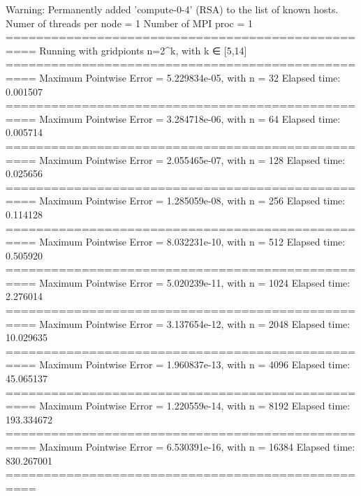 Warning: Permanently added 'compute-0-4' (RSA) to the list of known hosts.
Numer of threads per node = 1 
Number of MPI proc = 1 
================================================== 
Running with gridpionts n=2^k, with k ∈ [5,14]
================================================== 
Maximum Pointwise Error = 5.229834e-05, with n = 32 
Elapsed time: 0.001507
================================================== 
Maximum Pointwise Error = 3.284718e-06, with n = 64 
Elapsed time: 0.005714
================================================== 
Maximum Pointwise Error = 2.055465e-07, with n = 128 
Elapsed time: 0.025656
================================================== 
Maximum Pointwise Error = 1.285059e-08, with n = 256 
Elapsed time: 0.114128
================================================== 
Maximum Pointwise Error = 8.032231e-10, with n = 512 
Elapsed time: 0.505920
================================================== 
Maximum Pointwise Error = 5.020239e-11, with n = 1024 
Elapsed time: 2.276014
================================================== 
Maximum Pointwise Error = 3.137654e-12, with n = 2048 
Elapsed time: 10.029635
================================================== 
Maximum Pointwise Error = 1.960837e-13, with n = 4096 
Elapsed time: 45.065137
================================================== 
Maximum Pointwise Error = 1.220559e-14, with n = 8192 
Elapsed time: 193.334672
================================================== 
Maximum Pointwise Error = 6.530391e-16, with n = 16384 
Elapsed time: 830.267001
================================================== 
